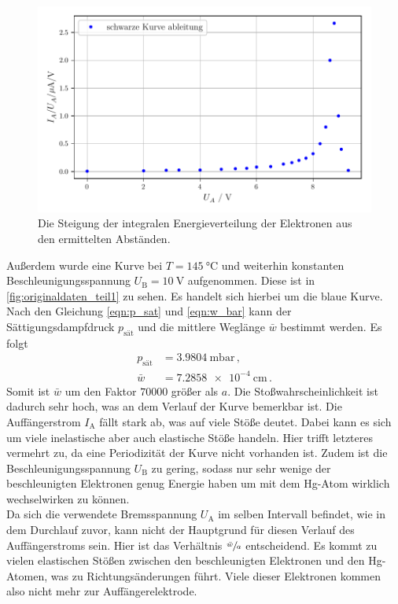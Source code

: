 \begin{figure}
    \centering
    \includegraphics[width=\textwidth]{bilder/ableitung.pdf}
    \caption{Die Steigung der integralen Energieverteilung der Elektronen aus den ermittelten Abständen.}
    \label{fig:ableitung}
\end{figure}


\noindent
Außerdem wurde eine Kurve bei $T = \SI{145}{\celsius}$ und weiterhin konstanten Beschleunigungsspannung $U_\text{B} = \SI{10}{\volt}$ aufgenommen.
Diese ist in \autoref{fig:originaldaten_teil1} zu sehen. 
Es handelt sich hierbei um die blaue Kurve.
Nach den Gleichung \eqref{eqn:p_sat} und \eqref{eqn:w_bar} kann der Sättigungsdampfdruck $p_\text{sät}$ und die mittlere Weglänge $\bar{w}$ bestimmt werden.
Es folgt
\begin{align*}
    p_\text{sät} &= \SI{3.9804}{\milli\bar} \, , \\
    \bar{w} &= \SI{7.2858e-4}{\centi\metre} \, .
\end{align*}
Somit ist $\bar{w}$ um den Faktor $70000$ größer als $a$.
Die Stoßwahrscheinlichkeit ist dadurch sehr hoch, was an dem Verlauf der Kurve bemerkbar ist.
Die Auffängerstrom $I_\text{A}$ fällt stark ab, was auf viele Stöße deutet.
Dabei kann es sich um viele inelastische aber auch elastische Stöße handeln.
Hier trifft letzteres vermehrt zu, da eine Periodizität der Kurve nicht vorhanden ist.
Zudem ist die Beschleunigungsspannung $U_\text{B}$ zu gering, sodass nur sehr wenige der beschleunigten Elektronen genug Energie haben um mit dem Hg-Atom wirklich wechselwirken zu können.\\
\noindent
Da sich die verwendete Bremsspannung $U_\text{A}$ im selben Intervall befindet, wie in dem Durchlauf zuvor, kann nicht der Hauptgrund für diesen Verlauf des Auffängerstroms sein.
Hier ist das Verhältnis $\sfrac{\bar{w}}{a}$ entscheidend.
Es kommt zu vielen elastischen Stößen zwischen den beschleunigten Elektronen und den Hg-Atomen, was zu Richtungsänderungen führt.
Viele dieser Elektronen kommen also nicht mehr zur Auffängerelektrode.

